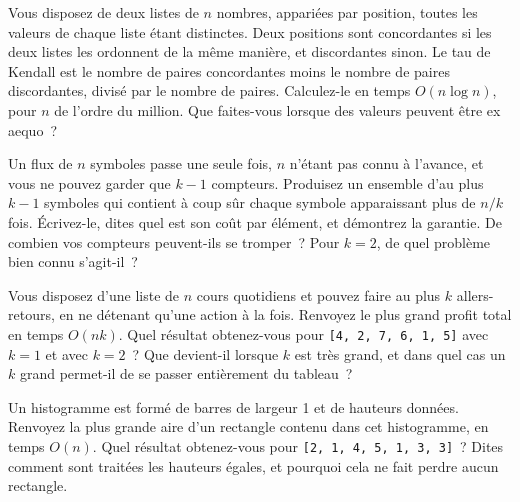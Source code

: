 \begin{question}\label{iq:iv3:algorithms:52}
Vous disposez de deux listes de $n$ nombres, appariées par position, toutes les valeurs de chaque liste étant distinctes. Deux positions sont concordantes si les deux listes les ordonnent de la même manière, et discordantes sinon. Le tau de Kendall est le nombre de paires concordantes moins le nombre de paires discordantes, divisé par le nombre de paires. Calculez-le en temps $O(n \log n)$, pour $n$ de l'ordre du million. Que faites-vous lorsque des valeurs peuvent être ex aequo~?
\end{question}

\begin{question}\label{iq:iv3:algorithms:53}
Un flux de $n$ symboles passe une seule fois, $n$ n'étant pas connu à l'avance, et vous ne pouvez garder que $k - 1$ compteurs. Produisez un ensemble d'au plus $k - 1$ symboles qui contient à coup sûr chaque symbole apparaissant plus de $n / k$ fois. Écrivez-le, dites quel est son coût par élément, et démontrez la garantie. De combien vos compteurs peuvent-ils se tromper~? Pour $k = 2$, de quel problème bien connu s'agit-il~?
\end{question}

\begin{question}\label{iq:iv3:algorithms:54}
Vous disposez d'une liste de $n$ cours quotidiens et pouvez faire au plus $k$ allers-retours, en ne détenant qu'une action à la fois. Renvoyez le plus grand profit total en temps $O(nk)$. Quel résultat obtenez-vous pour \texttt{[4, 2, 7, 6, 1, 5]} avec $k = 1$ et avec $k = 2$~? Que devient-il lorsque $k$ est très grand, et dans quel cas un $k$ grand permet-il de se passer entièrement du tableau~?
\end{question}

\begin{question}\label{iq:iv3:algorithms:55}
Un histogramme est formé de barres de largeur 1 et de hauteurs données. Renvoyez la plus grande aire d'un rectangle contenu dans cet histogramme, en temps $O(n)$. Quel résultat obtenez-vous pour \texttt{[2, 1, 4, 5, 1, 3, 3]}~? Dites comment sont traitées les hauteurs égales, et pourquoi cela ne fait perdre aucun rectangle.
\end{question}

